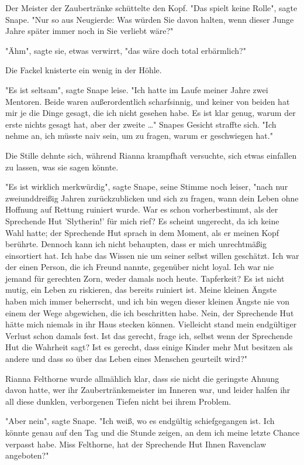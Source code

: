{Der Meister der Zaubertränke schüttelte den Kopf. "Das spielt keine Rolle", sagte Snape. "Nur so aus Neugierde: Was würden Sie davon halten, wenn dieser Junge Jahre später immer noch in Sie verliebt wäre?"

"Ähm", sagte sie, etwas verwirrt, "das wäre doch total erbärmlich?"

Die Fackel knisterte ein wenig in der Höhle.

"Es ist seltsam", sagte Snape leise. "Ich hatte im Laufe meiner Jahre zwei Mentoren. Beide waren außerordentlich scharfsinnig, und keiner von beiden hat mir je die Dinge gesagt, die ich nicht gesehen habe. Es ist klar genug, warum der erste nichts gesagt hat, aber der zweite …" Snapes Gesicht straffte sich. "Ich nehme an, ich müsste naiv sein, um zu fragen, warum er geschwiegen hat."

Die Stille dehnte sich, während Rianna krampfhaft versuchte, sich etwas einfallen zu lassen, was sie sagen könnte.

"Es ist wirklich merkwürdig", sagte Snape, seine Stimme noch leiser, "nach nur zweiunddreißig Jahren zurückzublicken und sich zu fragen, wann dein Leben ohne Hoffnung auf Rettung ruiniert wurde. War es schon vorherbestimmt, als der Sprechende Hut 'Slytherin!' für mich rief? Es scheint ungerecht, da ich keine Wahl hatte; der Sprechende Hut sprach in dem Moment, als er meinen Kopf berührte. Dennoch kann ich nicht behaupten, dass er mich unrechtmäßig einsortiert hat. Ich habe das Wissen nie um seiner selbst willen geschätzt. Ich war der einen Person, die ich Freund nannte, gegenüber nicht loyal. Ich war nie jemand für gerechten Zorn, weder damals noch heute. Tapferkeit? Es ist nicht mutig, ein Leben zu riskieren, das bereits ruiniert ist. Meine kleinen Ängste haben mich immer beherrscht, und ich bin wegen dieser kleinen Ängste nie von einem der Wege abgewichen, die ich beschritten habe. Nein, der Sprechende Hut hätte mich niemals in ihr Haus stecken können. Vielleicht stand mein endgültiger Verlust schon damals fest. Ist das gerecht, frage ich, selbst wenn der Sprechende Hut die Wahrheit sagt? Ist es gerecht, dass einige Kinder mehr Mut besitzen als andere und dass so über das Leben eines Menschen geurteilt wird?"

Rianna Felthorne wurde allmählich klar, dass sie nicht die geringste Ahnung davon hatte, wer ihr Zaubertränkemeister im Inneren war, und leider halfen ihr all diese dunklen, verborgenen Tiefen nicht bei ihrem Problem.

"Aber nein", sagte Snape. "Ich weiß, wo es endgültig schiefgegangen ist. Ich könnte genau auf den Tag und die Stunde zeigen, an dem ich meine letzte Chance verpasst habe. Miss Felthorne, hat der Sprechende Hut Ihnen Ravenclaw angeboten?"

}
